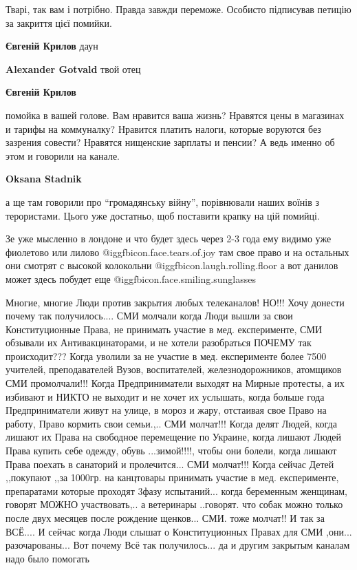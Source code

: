 \begin{itemize}
Тварі, так вам і потрібно. Правда завжди переможе. Особисто підписував петицію
за закриття цієї помийки.

\begin{itemize} %
\textbf{Євгеній Крилов} даун

\textbf{Alexander Gotvald} твой отец

\textbf{Євгеній Крилов} 

помойка в вашей голове. Вам нравится ваша жизнь? Нравятся цены в магазинах и
тарифы на коммуналку? Нравится платить налоги, которые воруются без зазрения
совести? Нравятся нищенские зарплаты и пенсии? А ведь именно об этом и говорили
на канале.

\textbf{Oksana Stadnik} 

а ще там говорили про \enquote{громадянську війну}, порівнювали наших воїнів з
терористами. Цього уже достатньо, щоб поставити крапку на цій помийці.

\end{itemize} %


Зе уже мысленно в лондоне и что будет здесь через 2-3 года ему видимо уже
фиолетово или лилово @igg{fbicon.face.tears.of.joy}  там свое право и на остальных они смотрят с высокой
колокольни @igg{fbicon.laugh.rolling.floor}  а вот данилов может здесь побудет еще @igg{fbicon.face.smiling.sunglasses} 


Многие, многие Люди против закрытия любых телеканалов! НО!!! Хочу донести почему
так получилось.... СМИ молчали когда Люди вышли за свои Конституционные
Права, не принимать участие в мед. експерименте, СМИ обзывали их
Антивакцинаторами, и не хотели разобраться ПОЧЕМУ так происходит??? Когда уволили
за не участие в мед. експерименте более 7500 учителей, преподавателей
Вузов, воспитателей, железнодорожников, атомщиков СМИ промолчали!!! Когда
Предприниматели выходят на Мирные протесты, а их избивают и НИКТО не выходит и
не хочет их услышать, когда больше года Предприниматели живут на улице, в мороз
и жару, отстаивая свое Право на работу, Право кормить свои семьи.,.. СМИ
молчат!!! Когда делят Людей, когда лишают их Права на свободное перемещение по
Украине, когда лишают Людей Права купить себе одежду, обувь ...зимой!!!!, чтобы
они болели, когда лишают Права поехать в санаторий и пролечится... СМИ
молчат!!! Когда сейчас Детей ,,покупают ,,за 1000гр. на канцтовары принимать
участие в мед. експерименте, препаратами которые проходят 3фазу испытаний... когда
беременным женщинам, говорят МОЖНО участвовать,.. а ветеринары ..говорят. что
собак можно только после двух месяцев после рождение щенков... СМИ. тоже
молчат!! И так за ВСЁ.... И сейчас когда Люди слышат о Конституционных Правах
для СМИ ,они... разочарованы... Вот почему Всё так получилось... да и другим
закрытым каналам надо было помогать


\end{itemize}
